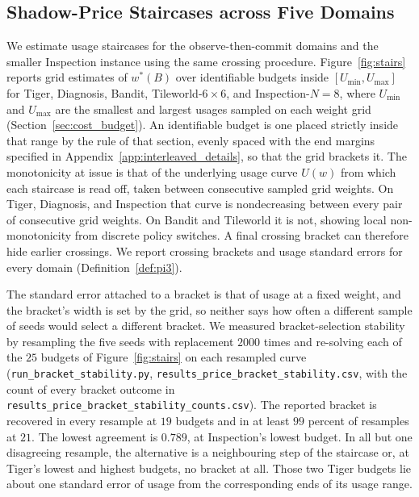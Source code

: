 \documentclass[manuscript, screen, review]{jair}
\begin{document}
\subsection{Shadow-Price Staircases across Five Domains}
\label{sec:stairs}

We estimate usage staircases for the observe-then-commit domains and the smaller Inspection instance using the same crossing procedure. Figure~\ref{fig:stairs} reports grid estimates of $w^*(B)$ over identifiable budgets inside $[U_{\min}, U_{\max}]$ for Tiger, Diagnosis, Bandit, Tileworld-$6{\times}6$, and Inspection-$N{=}8$, where $U_{\min}$ and $U_{\max}$ are the smallest and largest usages sampled on each weight grid (Section~\ref{sec:cost_budget}). An identifiable budget is one placed strictly inside that range by the rule of that section, evenly spaced with the end margins specified in Appendix~\ref{app:interleaved_details}, so that the grid brackets it. The monotonicity at issue is that of the underlying usage curve $U(w)$ from which each staircase is read off, taken between consecutive sampled grid weights. On Tiger, Diagnosis, and Inspection that curve is nondecreasing between every pair of consecutive grid weights. On Bandit and Tileworld it is not, showing local non-monotonicity from discrete policy switches. A final crossing bracket can therefore hide earlier crossings. We report crossing brackets and usage standard errors for every domain (Definition~\ref{def:pi3}).

The standard error attached to a bracket is that of usage at a fixed weight, and the bracket's width is set by the grid, so neither says how often a different sample of seeds would select a different bracket. We measured bracket-selection stability by resampling the five seeds with replacement $2000$ times and re-solving each of the $25$ budgets of Figure~\ref{fig:stairs} on each resampled curve (\texttt{run\_\allowbreak bracket\_\allowbreak stability.py}, \texttt{results\_\allowbreak price\_\allowbreak bracket\_\allowbreak stability.csv}, with the count of every bracket outcome in \texttt{results\_\allowbreak price\_\allowbreak bracket\_\allowbreak stability\_\allowbreak counts.csv}). The reported bracket is recovered in every resample at $19$ budgets and in at least $99$ percent of resamples at $21$. The lowest agreement is $0.789$, at Inspection's lowest budget. In all but one disagreeing resample, the alternative is a neighbouring step of the staircase or, at Tiger's lowest and highest budgets, no bracket at all. Those two Tiger budgets lie about one standard error of usage from the corresponding ends of its usage range.
\end{document}
